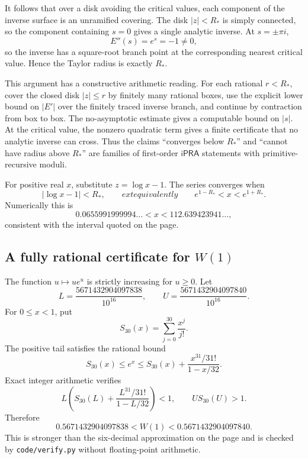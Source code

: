 \documentclass[11pt]{article}
\theoremstyle{definition}
\newcommand{\ipra}{\mathsf{iPRA}}
\newcommand{\code}[1]{\texttt{#1}}
\begin{document}
It follows that over a disk avoiding the critical values, each component of the
inverse surface is an unramified covering.  The disk \(|z|<R_*\) is simply
connected, so the component containing \(s=0\) gives a single analytic inverse.
At \(s=\pm\pi i\),
\[
 E''(s)=e^s=-1\ne0,
\]
so the inverse has a square-root branch point at the corresponding nearest
critical value.  Hence the Taylor radius is exactly \(R_*\).

This argument has a constructive arithmetic reading.  For each rational
\(r<R_*\), cover the closed disk \(|z|\le r\) by finitely many rational boxes,
use the explicit lower bound on \(|E'|\) over the finitely traced inverse branch,
and continue by contraction from box to box.  The no-asymptotic estimate gives
a computable bound on \(|s|\).  At the critical value, the nonzero quadratic
term gives a finite certificate that no analytic inverse can cross.  Thus the
claims ``converges below \(R_*\)'' and ``cannot have radius above \(R_*\)'' are
families of first-order \(\ipra\) statements with primitive-recursive moduli.

For positive real \(x\), substitute \(z=\log x-1\).  The series converges when
\begin{equation}\label{eq:W-real-interval}
 |\log x-1|<R_*,
 \qquad	ext{equivalently}
 \qquad e^{1-R_*}<x<e^{1+R_*}.
\end{equation}
Numerically this is
\[
 0.0655991999994\ldots<x<112.639423941\ldots,
\]
consistent with the interval quoted on the page.

\subsection{A fully rational certificate for \(W(1)\)}

The function \(u\mapsto ue^u\) is strictly increasing for \(u\ge0\).  Let
\[
 L=\frac{5671432904097838}{10^{16}},\qquad
 U=\frac{5671432904097840}{10^{16}}.
\]
For \(0\le x<1\), put
\[
 S_{30}(x)=\sum_{j=0}^{30}\frac{x^j}{j!}.
\]
The positive tail satisfies the rational bound
\[
 S_{30}(x)\le e^x\le
 S_{30}(x)+\frac{x^{31}/31!}{1-x/32}.
\]
Exact integer arithmetic verifies
\[
 L\left(S_{30}(L)+\frac{L^{31}/31!}{1-L/32}\right)<1,
 \qquad U S_{30}(U)>1.
\]
Therefore
\begin{equation}\label{eq:omega-cert}
 0.5671432904097838<W(1)<0.5671432904097840.
\end{equation}
This is stronger than the six-decimal approximation on the page and is checked
by \code{code/verify.py} without floating-point arithmetic.
\end{document}
